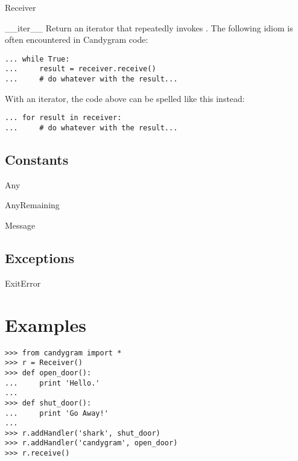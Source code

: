 \documentclass{howto}
\begin{document}
\begin{classdesc}{Receiver}{}
\begin{methoddesc}{__iter__}{}
Return an iterator that repeatedly invokes . The following
idiom is often encountered in Candygram code:
\begin{verbatim}
... while True:
...     result = receiver.receive()
...     # do whatever with the result...
\end{verbatim}
With an iterator, the code above can be spelled like this instead:
\begin{verbatim}
... for result in receiver:
...     # do whatever with the result...
\end{verbatim}
\end{methoddesc}

\end{classdesc}



\subsection{Constants}

\begin{datadesc}{Any}
\end{datadesc}

\begin{datadesc}{AnyRemaining}
\end{datadesc}

\begin{datadesc}{Message}
\end{datadesc}



\subsection{Exceptions}

\begin{excdesc}{ExitError}
\end{excdesc}



\section{Examples}

\begin{verbatim}
>>> from candygram import *
>>> r = Receiver()
>>> def open_door():
...     print 'Hello.'
...
>>> def shut_door():
...     print 'Go Away!'
...
>>> r.addHandler('shark', shut_door)
>>> r.addHandler('candygram', open_door)
>>> r.receive()
\end{verbatim}
\end{document}
